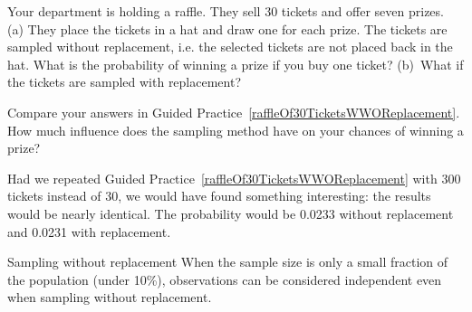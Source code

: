 \begin{exercisewrap}
\begin{nexercise} \label{raffleOf30TicketsWWOReplacement}
Your department is holding a raffle. They sell 30 tickets and offer seven prizes. (a) They place the tickets in a hat and draw one for each prize. The tickets are sampled without replacement, i.e. the selected tickets are not placed back in the hat. What is the probability of winning a prize if you buy one ticket? (b)~What if the tickets are sampled with replacement?\footnotemark
\end{nexercise}
\end{exercisewrap}

\begin{exercisewrap}
\begin{nexercise} \label{followUpToRaffleOf30TicketsWWOReplacement}
Compare your answers in Guided Practice~\ref{raffleOf30TicketsWWOReplacement}. How much influence does the sampling method have on your chances of winning a prize?\footnotemark
\end{nexercise}
\end{exercisewrap}

Had we repeated Guided Practice~\ref{raffleOf30TicketsWWOReplacement} with 300 tickets instead of 30, we would have found something interesting: the results would be nearly identical. The probability would be 0.0233 without replacement and 0.0231 with replacement. 

\begin{onebox}{Sampling without replacement}
When the sample size is only a small fraction of the population (under 10\%), observations can be considered independent even when sampling without replacement.
\end{onebox}
\label{samplingworeplacement}


